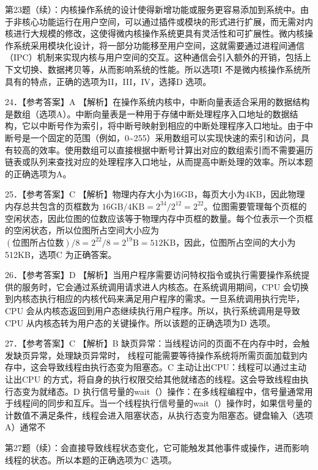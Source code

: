 \documentclass[UTF8,11pt]{ctexart}
\begin{document}
第23题（续）：内核操作系统的设计使得新增功能或服务更容易添加到系统中。由于非核心功能运行在用户空间，可以通过插件或模块的形式进行扩展，而无需对内核进行大规模的修改，这使得微内核操作系统更具有灵活性和可扩展性。微内核操作系统采用模块化设计，将一部分功能移至用户空间，这就需要通过进程间通信（IPC）机制来实现内核与用户空间的交互。这种通信会引入额外的开销，包括上下文切换、数据拷贝等，从而影响系统的性能。所以选项I 不是微内核操作系统所具有的特点，正确的选项为II，III，IV，选择D 选项。


24．【参考答案】A 【解析】在操作系统内核中，中断向量表适合采用的数据结构是数组（选项A）。中断向量表是一种用于存储中断处理程序入口地址的数据结构，它以中断号作为索引，将中断号映射到相应的中断处理程序入口地址。由于中断号是一个固定的范围（例如，0\textasciitilde{}255）采用数组可以实现快速的索引和访问，具有较高的效率。使用数组可以直接根据中断号计算出对应的数组索引而不需要遍历链表或队列来查找对应的处理程序入口地址，从而提高中断处理的效率。所以本题的正确选项为A。


25．【参考答案】C 【解析】物理内存大小为16GB，每页大小为4KB，因此物理内存总共包含的页框数为 \(\displaystyle 16\mathrm{GB}/4\mathrm{KB}=2^{34}/2^{12}=2^{22}\)。位图需要管理每个页框的空闲状态，因此位图的位数应该等于物理内存中页框的数量。每个位表示一个页框的空闲状态，所以位图所占空间大小应为\(\displaystyle (\text{位图所占位数})/8=2^{22}/8=2^{19}\mathrm{B}=512\mathrm{KB}\)，因此，位图所占空间的大小为512KB，选项C 为正确答案。


26．【参考答案】D 【解析】当用户程序需要访问特权指令或执行需要操作系统提供的服务时，它会通过系统调用请求进人内核态。在系统调用期间，CPU 会切换到内核态执行相应的内核代码来满足用户程序的需求。一旦系统调用执行完毕，CPU 会从内核态返回到用户态继续执行用户程序。所以，执行系统调用是导致CPU 从内核态转为用户态的关键操作。所以该题的正确选项为D 选项。


27．【参考答案】C 【解析】B 缺页异常：当线程访问的页面不在内存中时，会触发缺页异常，处理缺页异常时， 线程可能需要等待操作系统将所需页面加载到内存中，这会导致线程由执行态变为阻塞态。C 主动让出CPU：线程可以通过主动让出CPU 的方式，将自身的执行权限交给其他就绪态的线程。这会导致线程由执行态变为就绪态。D 执行信号量的wait（）操作：在多线程编程中，信号量通常用于线程间的同步和互斥。当一个线程执行信号量的wait（）操作时，如果信号量的计数值不满足条件，线程会进入阻塞状态，从执行态变为阻塞态。键盘输入（选项A）通常不


第27题（续）：会直接导致线程状态变化，它可能触发其他事件或操作，进而影响线程的状态。所以本题的正确选项为C 选项。
\end{document}
